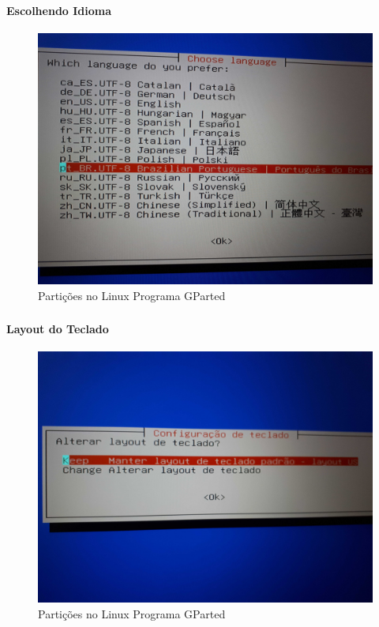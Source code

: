 \documentclass{beamer}
\begin{document}
\begin{frame}[plain,c]
   \frametitle{\insertsection}
    \framesubtitle{Escolhendo Idioma}
    \begin{figure}[!h]
        
        \includegraphics[width=1\linewidth]{images/backup/bkp3.jpg}
        \caption{Partições no Linux Programa GParted}
    \end{figure}
\end{frame}

\begin{frame}[plain,c]
   \frametitle{\insertsection}
    \framesubtitle{Layout do Teclado}
    \begin{figure}[!h]
        
        \includegraphics[width=1\linewidth]{images/backup/bkp4.jpg}
        \caption{Partições no Linux Programa GParted}
    \end{figure}
\end{frame}
\end{document}
